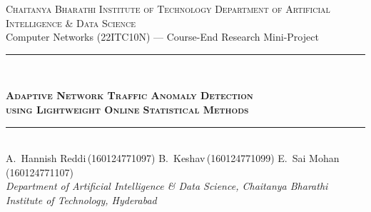 \documentclass[11pt,a4paper]{article}
\begin{document}
\sloppy
\thispagestyle{plain}

\begin{center}
  {\footnotesize\scshape Chaitanya Bharathi Institute of Technology \quad\textbullet\quad
   Department of Artificial Intelligence \& Data Science}\\[2pt]
  {\footnotesize Computer Networks (22ITC10N) --- Course-End Research Mini-Project}\\[16pt]

  \rule{\textwidth}{0.5pt}\\[7pt]
  {\LARGE\bfseries\scshape Adaptive Network Traffic Anomaly Detection\\[2pt]
   using Lightweight Online Statistical Methods\par}
  \vspace{7pt}
  \rule{\textwidth}{0.5pt}\\[12pt]

  {\normalsize A.~Hannish Reddi\,(160124771097) \quad B.~Keshav\,(160124771099)
   \quad E.~Sai Mohan\,(160124771107)}\\[3pt]
  {\footnotesize\itshape Department of Artificial Intelligence \& Data Science,
   Chaitanya Bharathi Institute of Technology, Hyderabad}\\[2pt]
\end{center}
\vspace{4pt}
\end{document}
